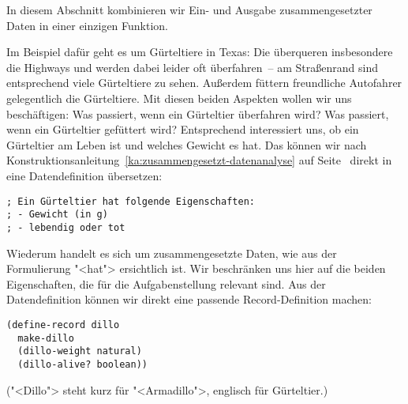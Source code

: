 In diesem Abschnitt kombinieren wir Ein- und
Ausgabe zusammengesetzter Daten in einer einzigen Funktion.

Im Beispiel dafür geht es um Gürteltiere in Texas:
Die überqueren insbesondere die Highways
und werden dabei leider oft überfahren~-- am Straßenrand
sind entsprechend viele Gürteltiere zu sehen.  Außerdem füttern
freundliche Autofahrer gelegentlich die Gürteltiere.  Mit diesen
beiden Aspekten wollen wir uns beschäftigen: Was passiert, wenn ein
Gürteltier überfahren wird?  Was passiert, wenn ein Gürteltier
gefüttert wird?  Entsprechend interessiert uns, ob ein Gürteltier am
Leben ist und welches Gewicht es hat.  Das können wir nach
Konstruktionsanleitung~\ref{ka:zusammengesetzt-datenanalyse} auf
Seite~\pageref{ka:zusammengesetzt-datenanalyse} direkt in eine
Datendefinition übersetzen:
%
\begin{lstlisting}
; Ein Gürteltier hat folgende Eigenschaften:
; - Gewicht (in g)
; - lebendig oder tot
\end{lstlisting}
%
Wiederum handelt es sich um zusammengesetzte Daten, wie
aus der Formulierung "<hat"> ersichtlich ist.  Wir beschränken uns
hier auf die beiden Eigenschaften, die für die Aufgabenstellung
relevant sind.
Aus der Datendefinition können wir direkt eine passende
Record-Definition machen:
% 
\begin{lstlisting}
(define-record dillo
  make-dillo
  (dillo-weight natural)
  (dillo-alive? boolean))
\end{lstlisting}
%
("<Dillo"> steht kurz für "<Armadillo">, englisch für Gürteltier.)

